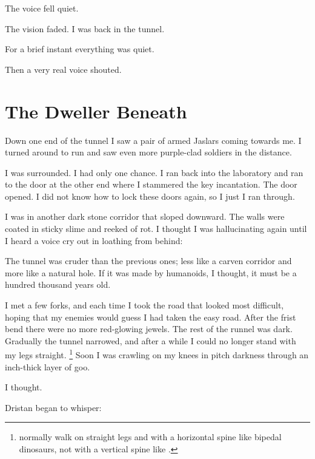 \documentclass
  [a4paper,
   12pt,
   oneside
  ]%
  {article}
\begin{document}
The voice fell quiet. 

The vision faded. 
I was back in the tunnel. 

For a brief instant everything was quiet.

Then a very real voice shouted. 










\section{The Dweller Beneath}
Down one end of the tunnel I saw a pair of armed Jaslars coming towards me. 
I turned around to run and saw even more purple-clad soldiers in the distance. 

I was surrounded. 
I had only one chance. 
I ran back into the laboratory and ran to the door at the other end where I stammered the key incantation. 
The door opened. 
I did not know how to lock these doors again, so I just I ran through.

I was in another dark stone corridor that sloped downward. 
The walls were coated in sticky slime and reeked of rot. 
I thought I was hallucinating again until I heard a voice cry out in loathing from behind: 

The tunnel was cruder than the previous ones; less like a carven corridor and more like a natural hole. 
If it was made by humanoids, I thought, it must be a hundred thousand years old. 

I met a few forks, and each time I took the road that looked most difficult, hoping that my enemies would guess I had taken the easy road. 
After the frist bend there were no more red-glowing jewels. 
The rest of the runnel was dark. 
Gradually the tunnel narrowed, and after a while I could no longer stand with my legs straight.%
\footnote{\Scathae normally walk on straight legs and with a horizontal spine like bipedal dinosaurs, not with a vertical spine like \humans.} 
Soon I was crawling on my knees in pitch darkness through an inch-thick layer of goo. 

 I thought.

Dristan began to whisper: 
\end{document}
